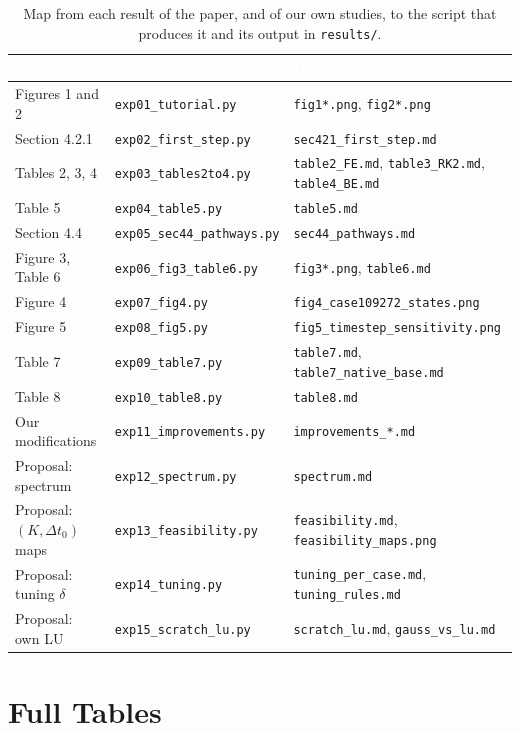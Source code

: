 \documentclass[11pt,a4paper]{article}
\newcommand{\thead}[1]{\textcolor{white}{\sffamily\bfseries\small #1}}
\newcommand{\headrow}{\rowcolor{navy}}
\newcommand{\code}[1]{\texttt{#1}}
\begin{document}
\begin{table}[h]
\centering
\caption[Map from each result to its script]{Map from each result of the paper, and of our own studies, to
the script that produces it and its output in \code{results/}.}
\label{tab:scripts}
\small
\begin{tabular}{@{}l l l@{}}
\toprule
\headrow \thead{Result} & \thead{Script} & \thead{Output} \\
\midrule
Figures 1 and 2 & \code{exp01\_tutorial.py} & \code{fig1*.png}, \code{fig2*.png} \\
Section 4.2.1 & \code{exp02\_first\_step.py} & \code{sec421\_first\_step.md} \\
Tables 2, 3, 4 & \code{exp03\_tables2to4.py} & \code{table2\_FE.md}, \code{table3\_RK2.md}, \code{table4\_BE.md} \\
Table 5 & \code{exp04\_table5.py} & \code{table5.md} \\
Section 4.4 & \code{exp05\_sec44\_pathways.py} & \code{sec44\_pathways.md} \\
Figure 3, Table 6 & \code{exp06\_fig3\_table6.py} & \code{fig3*.png}, \code{table6.md} \\
Figure 4 & \code{exp07\_fig4.py} & \code{fig4\_case109272\_states.png} \\
Figure 5 & \code{exp08\_fig5.py} & \code{fig5\_timestep\_sensitivity.png} \\
Table 7 & \code{exp09\_table7.py} & \code{table7.md}, \code{table7\_native\_base.md} \\
Table 8 & \code{exp10\_table8.py} & \code{table8.md} \\
Our modifications & \code{exp11\_improvements.py} & \code{improvements\_*.md} \\
Proposal: spectrum & \code{exp12\_spectrum.py} & \code{spectrum.md} \\
Proposal: $(K,\Delta t_0)$ maps & \code{exp13\_feasibility.py} & \code{feasibility.md}, \code{feasibility\_maps.png} \\
Proposal: tuning $\delta$ & \code{exp14\_tuning.py} & \code{tuning\_per\_case.md}, \code{tuning\_rules.md} \\
Proposal: own LU & \code{exp15\_scratch\_lu.py} & \code{scratch\_lu.md}, \code{gauss\_vs\_lu.md} \\
\bottomrule
\end{tabular}
\end{table}

\section{Full Tables}\label{app:tables}
\end{document}
